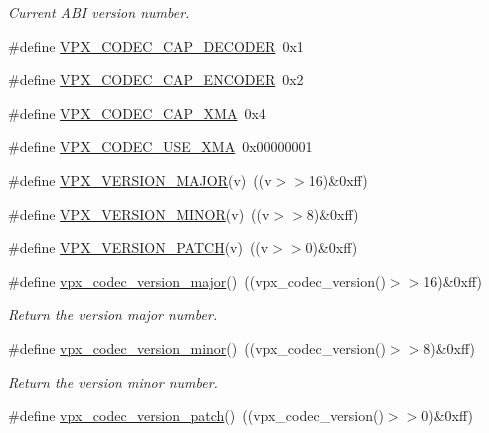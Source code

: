 \begin{DoxyCompactItemize}
\begin{DoxyCompactList}\small\item\em \-Current \-A\-B\-I version number. \end{DoxyCompactList}\item 
\#define \hyperlink{group__codec_gae10ad7f9548170aef77df09d48ad108a}{\-V\-P\-X\-\_\-\-C\-O\-D\-E\-C\-\_\-\-C\-A\-P\-\_\-\-D\-E\-C\-O\-D\-E\-R}~0x1
\item 
\#define \hyperlink{group__codec_gab2e8b76fff95ebd573a17bdc11f8a441}{\-V\-P\-X\-\_\-\-C\-O\-D\-E\-C\-\_\-\-C\-A\-P\-\_\-\-E\-N\-C\-O\-D\-E\-R}~0x2
\item 
\#define \hyperlink{group__codec_gadbaf864317eb8294fd518862a1e6f9d4}{\-V\-P\-X\-\_\-\-C\-O\-D\-E\-C\-\_\-\-C\-A\-P\-\_\-\-X\-M\-A}~0x4
\item 
\#define \hyperlink{group__codec_gab363c255f13717f693762c3dcf0b93d6}{\-V\-P\-X\-\_\-\-C\-O\-D\-E\-C\-\_\-\-U\-S\-E\-\_\-\-X\-M\-A}~0x00000001
\item 
\#define \hyperlink{group__codec_gadebddd67347fe47c0772b1e06b6173ba}{\-V\-P\-X\-\_\-\-V\-E\-R\-S\-I\-O\-N\-\_\-\-M\-A\-J\-O\-R}(v)~((v$>$$>$16)\&0xff)
\item 
\#define \hyperlink{group__codec_ga4a5ce4588576306dee0d95e8f8706f86}{\-V\-P\-X\-\_\-\-V\-E\-R\-S\-I\-O\-N\-\_\-\-M\-I\-N\-O\-R}(v)~((v$>$$>$8)\&0xff)
\item 
\#define \hyperlink{group__codec_ga4acf2cf4c35ff123d17cd67c069fdbaa}{\-V\-P\-X\-\_\-\-V\-E\-R\-S\-I\-O\-N\-\_\-\-P\-A\-T\-C\-H}(v)~((v$>$$>$0)\&0xff)
\item 
\hypertarget{group__codec_gaf314b746e4e202045e85ac073c29a495}{
\#define \hyperlink{group__codec_gaf314b746e4e202045e85ac073c29a495}{vpx\-\_\-codec\-\_\-version\-\_\-major}()~((vpx\-\_\-codec\-\_\-version()$>$$>$16)\&0xff)}
\label{group__codec_gaf314b746e4e202045e85ac073c29a495}

\begin{DoxyCompactList}\small\item\em \-Return the version major number. \end{DoxyCompactList}\item 
\hypertarget{group__codec_ga2b668688a7d1551ea89bcda8f2587f93}{
\#define \hyperlink{group__codec_ga2b668688a7d1551ea89bcda8f2587f93}{vpx\-\_\-codec\-\_\-version\-\_\-minor}()~((vpx\-\_\-codec\-\_\-version()$>$$>$8)\&0xff)}
\label{group__codec_ga2b668688a7d1551ea89bcda8f2587f93}

\begin{DoxyCompactList}\small\item\em \-Return the version minor number. \end{DoxyCompactList}\item 
\hypertarget{group__codec_ga8ed64bded0d763fa2158312ac8fbcf26}{
\#define \hyperlink{group__codec_ga8ed64bded0d763fa2158312ac8fbcf26}{vpx\-\_\-codec\-\_\-version\-\_\-patch}()~((vpx\-\_\-codec\-\_\-version()$>$$>$0)\&0xff)}
\label{group__codec_ga8ed64bded0d763fa2158312ac8fbcf26}


\end{DoxyCompactItemize}
